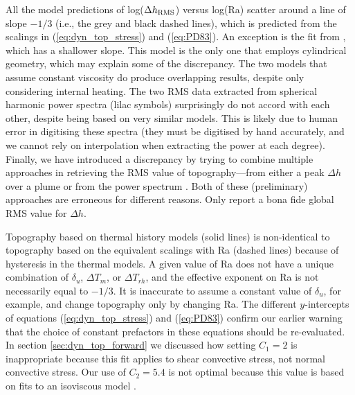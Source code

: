 All the model predictions of log($\Delta h_{\rm RMS}$) versus log(Ra) scatter around a line of slope $-1/3$ (i.e., the grey and black dashed lines), which is predicted from the scalings in (\ref{eq:dyn_top_stress}) and (\ref{eq:PD83}). An exception is the fit from \citet{Kiefer1992}, which has a shallower slope. This model is the only one that employs cylindrical geometry, which may explain some of the discrepancy. The two models that assume constant viscosity \citep{Nimmo1996, Kiefer1998} do produce overlapping results, despite only \citet{Kiefer1998} considering internal heating. The two RMS data extracted from spherical harmonic power spectra (lilac symbols) surprisingly do not accord with each other, despite being based on very similar models. This is likely due to human error in digitising these spectra (they must be digitised by hand accurately, and we cannot rely on interpolation when extracting the power at each degree). Finally, we have introduced a discrepancy by trying to combine multiple approaches in retrieving the RMS value of topography---from either a peak $\Delta h$ over a plume \citep{Kiefer1992, Moresi1995, Nimmo1996} or from the power spectrum \citep{Huang2013, Yang2016}. Both of these (preliminary) approaches are erroneous for different reasons. Only \citet{Kiefer1998} report a bona fide global RMS value for $\Delta h$.



Topography based on thermal history models (solid lines) is non-identical to topography based on the equivalent scalings with Ra (dashed lines) because of hysteresis in the thermal models. A given value of Ra does not have a unique combination of $\delta_u$, $\Delta T_m$, or $\Delta T_{rh}$, and the effective exponent on Ra is not necessarily equal to $-1/3$. It is inaccurate to assume a constant value of $\delta_u$, for example, and change topography only by changing Ra. The different $y$-intercepts of equations (\ref{eq:dyn_top_stress}) and (\ref{eq:PD83}) confirm our earlier warning that the choice of constant prefactors in these equations should be re-evaluated. In section \ref{sec:dyn_top_forward} we discussed how setting $C_1=2$ is inappropriate because this fit applies to shear convective stress, not normal convective stress. Our use of $C_2 = 5.4$ is not optimal because this value is based on fits to an isoviscous model \citep{Lees2019}.



